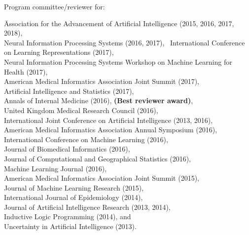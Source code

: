 Program committee/reviewer for: \vspace*{-0.5em}
\begin{tabbing}
\hspace*{2em}\= Association for the Advancement of Artificial Intelligence (2015, 2016, 2017, 2018),\\
\> Neural Information Processing Systems (2016, 2017),\
\> International Conference on Learning Representations (2017),\\
\> Neural Information Processing Systems Workshop on Machine Learning for Health (2017), \\
\> American Medical Informatics Association Joint Summit (2017),\\
\> Artificial Intelligence and Statistics (2017),\\
\> Annals of Internal Medicine (2016), \textbf{(Best reviewer award)},\\
\> United Kingdom Medical Research Council (2016),\\
\> International Joint Conference on Artificial Intelligence (2013, 2016),\\
\> American Medical Informatics Association Annual Symposium (2016),\\
\> International Conference on Machine Learning (2016),\\
\> Journal of Biomedical Informatics (2016), \\
\> Journal of Computational and Geographical Statistics (2016),\\
\> Machine Learning Journal (2016),\\
\> American Medical Informatics Association Joint Summit (2015),\\
\> Journal of Machine Learning Research (2015),\\
\> International Journal of Epidemiology (2014),\\
\> Journal of Artificial Intelligence Research (2013, 2014),\\
\> Inductive Logic Programming (2014), and \\
\> Uncertainty in Artificial Intelligence (2013).
\end{tabbing}


